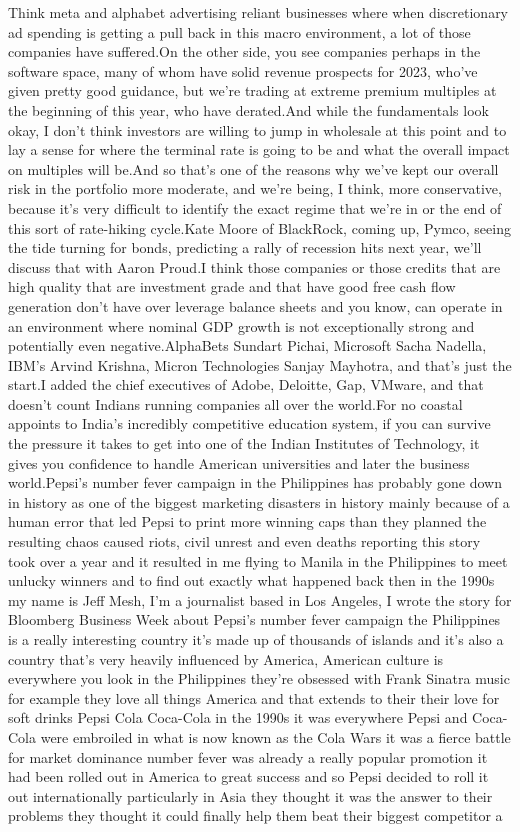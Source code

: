 \documentclass{article}%
\begin{document}
Think meta and alphabet advertising reliant businesses where when discretionary ad spending is getting a pull back in this macro environment, a lot of those companies have suffered.On the other side, you see companies perhaps in the software space, many of whom have solid revenue prospects for 2023, who've given pretty good guidance, but we're trading at extreme premium multiples at the beginning of this year, who have derated.And while the fundamentals look okay, I don't think investors are willing to jump in wholesale at this point and to lay a sense for where the terminal rate is going to be and what the overall impact on multiples will be.And so that's one of the reasons why we've kept our overall risk in the portfolio more moderate, and we're being, I think, more conservative, because it's very difficult to identify the exact regime that we're in or the end of this sort of rate{-}hiking cycle.Kate Moore of BlackRock, coming up, Pymco, seeing the tide turning for bonds, predicting a rally of recession hits next year, we'll discuss that with Aaron Proud.I think those companies or those credits that are high quality that are investment grade and that have good free cash flow generation don't have over leverage balance sheets and you know, can operate in an environment where nominal GDP growth is not exceptionally strong and potentially even negative.AlphaBets Sundart Pichai, Microsoft Sacha Nadella, IBM's Arvind Krishna, Micron Technologies Sanjay Mayhotra, and that's just the start.I added the chief executives of Adobe, Deloitte, Gap, VMware, and that doesn't count Indians running companies all over the world.For no coastal appoints to India's incredibly competitive education system, if you can survive the pressure it takes to get into one of the Indian Institutes of Technology, it gives you confidence to handle American universities and later the business world.Pepsi's number fever campaign in the Philippines has probably gone down in history as one of the biggest marketing disasters in history mainly because of a human error that led Pepsi to print more winning caps than they planned the resulting chaos caused riots, civil unrest and even deaths reporting this story took over a year and it resulted in me flying to Manila in the Philippines to meet unlucky winners and to find out exactly what happened back then in the 1990s my name is Jeff Mesh, I'm a journalist based in Los Angeles, I wrote the story for Bloomberg Business Week about Pepsi's number fever campaign the Philippines is a really interesting country it's made up of thousands of islands and it's also a country that's very heavily influenced by America, American culture is everywhere you look in the Philippines they're obsessed with Frank Sinatra music for example they love all things America and that extends to their their love for soft drinks Pepsi Cola Coca{-}Cola in the 1990s it was everywhere Pepsi and Coca{-}Cola were embroiled in what is now known as the Cola Wars it was a fierce battle for market dominance number fever was already a really popular promotion it had been rolled out in America to great success and so Pepsi decided to roll it out internationally particularly in Asia they thought it was the answer to their problems they thought it could finally help them beat their biggest competitor a 
\end{document}
